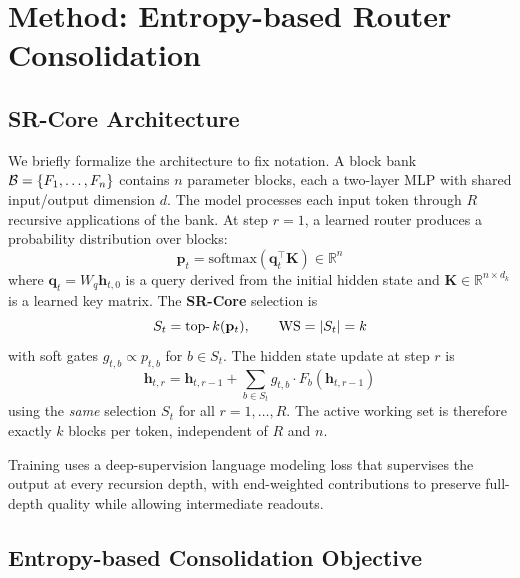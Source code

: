 \section{Method: Entropy-based Router Consolidation}
\label{sec:method}

\subsection{SR-Core Architecture}
\label{sec:arch}

We briefly formalize the architecture to fix notation.
A block bank $\mathcal{B} = \{F_1, \ldots, F_n\}$ contains $n$ parameter blocks, each a two-layer
MLP with shared input/output dimension $d$.
The model processes each input token through $R$ recursive applications of the bank.
At step $r = 1$, a learned router produces a probability distribution over blocks:
\begin{equation}
  \mathbf{p}_t
    = \mathrm{softmax}\!\left(\mathbf{q}_t^\top \mathbf{K}\right) \in \mathbb{R}^n
  \label{eq:router}
\end{equation}
where $\mathbf{q}_t = W_q \mathbf{h}_{t,0}$ is a query derived from the initial hidden
state and $\mathbf{K} \in \mathbb{R}^{n \times d_k}$ is a learned key matrix.
The \textbf{SR-Core} selection is
\begin{equation}
  S_t = \operatorname{top-}k(\mathbf{p}_t), \qquad \mathrm{WS} = |S_t| = k
  \label{eq:srcore}
\end{equation}
with soft gates $g_{t,b} \propto p_{t,b}$ for $b \in S_t$.
The hidden state update at step $r$ is
\begin{equation}
  \mathbf{h}_{t,r}
    = \mathbf{h}_{t,r-1}
      + \sum_{b \in S_t} g_{t,b} \cdot F_b(\mathbf{h}_{t,r-1})
  \label{eq:update}
\end{equation}
using the \emph{same} selection $S_t$ for all $r = 1, \ldots, R$.
The active working set is therefore exactly $k$ blocks per token, independent of $R$ and $n$.

Training uses a deep-supervision language modeling loss that supervises the output at every
recursion depth, with end-weighted contributions to preserve full-depth quality while
allowing intermediate readouts.

\subsection{Entropy-based Consolidation Objective}
\label{sec:objective}


